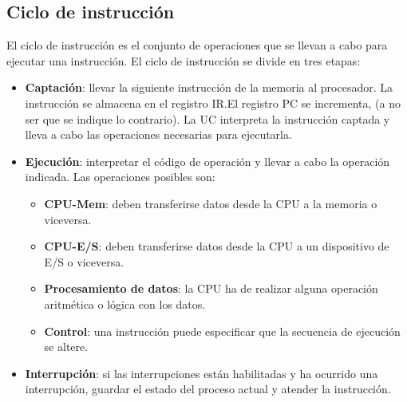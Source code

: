 \subsection{Ciclo de instrucción}

El ciclo de instrucción es el conjunto de operaciones que se llevan a cabo para ejecutar una instrucción. El ciclo de instrucción se divide en tres etapas:

\begin{itemize}
  \item \textbf{Captación}: llevar la siguiente instrucción de la memoria al procesador. La instrucción se almacena en el registro IR.\@ El registro PC se incrementa, (a no ser que se indique lo contrario). La UC interpreta la instrucción captada y lleva a cabo las operaciones necesarias para ejecutarla.
  \item \textbf{Ejecución}: interpretar el código de operación y llevar a cabo la operación indicada. Las operaciones posibles son:
  \begin{itemize}
    \item \textbf{CPU-Mem}: deben transferirse datos desde la CPU a la memoria o viceversa.
    \item \textbf{CPU-E/S}: deben transferirse datos desde la CPU a un dispositivo de E/S o viceversa.
    \item \textbf{Procesamiento de datos}: la CPU ha de realizar alguna operación aritmética o lógica con los datos.
    \item \textbf{Control}: una instrucción puede especificar que la secuencia de ejecución se altere.
  \end{itemize}
  \item \textbf{Interrupción}: si las interrupciones están habilitadas y ha ocurrido una interrupción, guardar el estado del proceso actual y atender la instrucción.
\end{itemize}